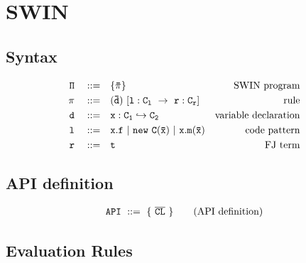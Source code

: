 \documentclass[letterpaper]{article}
\begin{document}
\section{SWIN}
\subsection{Syntax}
\begin{align*}
  \tt \Pi \quad ::=\quad  &\tt  \{\bar{\pi}\}                     & \text{SWIN program}\\
  \tt \pi \quad ::=\quad  &\tt  (\bar{d})\ [l:C_l\ \rightarrow\ r:C_r]    & \text{rule}\\
  \tt d   \quad ::=\quad  &\tt  x:C_1\hookrightarrow C_2          & \text{variable declaration}\\
  \tt l   \quad ::=\quad  &\tt  x.f ~ | ~ new\ C(\bar{x}) ~|~ x.m(\bar{x})  &\text{code pattern}\\
  \tt r   \quad ::=\quad  &\tt  t                                 & \text{FJ term}
\end{align*}

\subsection{API definition}
\begin{align*}
 \tt API ~ ::=\tt ~ \{ ~ \overline{CL} ~ \}\qquad\text{(API definition)}\\
\end{align*}

\subsection{Evaluation Rules}
\begin{center}
                             
\DP
\end{center}
\vspace{2pt}

\begin{center}
                             
\DP
\end{center}
\vspace{2pt}
\end{document}
